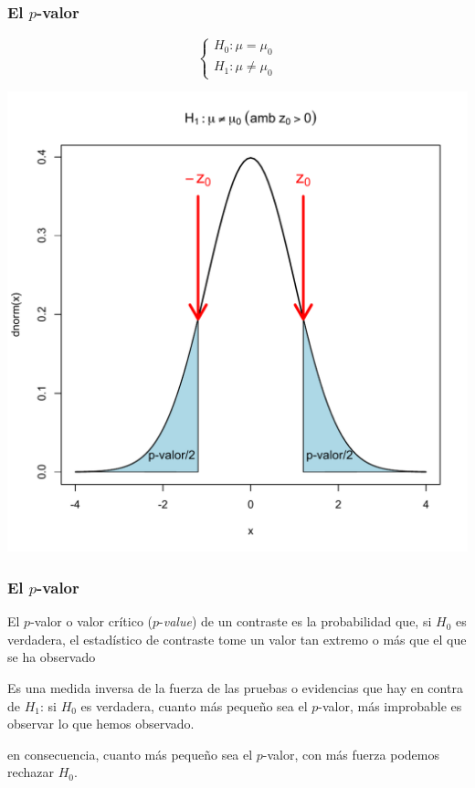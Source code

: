 \documentclass[12pt,t]{beamer}\usepackage[]{graphicx}\usepackage[]{color}
\renewcommand{\emph}[1]{{\color{red}#1}}
\theoremstyle{plain}
\theoremstyle{definition}
\begin{document}
\begin{frame}
\frametitle{El $p$-valor}
\vspace*{-0.75cm}

$$
\left\{\begin{array}{l}
H_{0}:\mu=\mu_{0}\\ H_{1}:\mu\neq\mu_{0}
\end{array}
\right.
$$
\begin{center}
\includegraphics[width=0.7\linewidth]{pvalor11.pdf}
\end{center}

\end{frame}


\begin{frame}
\frametitle{El $p$-valor}

El  \emph{$p$-valor} o  \emph{valor crítico}  ($p$-\textsl{value}) de un contraste es la probabilidad que, si $H_0$ es verdadera, el estadístico de contraste tome un valor tan extremo o  más que el que se ha observado
\bigskip


Es una  \emph{medida inversa de la fuerza de las pruebas o evidencias que hay en contra de $H_1$}: si $H_0$ es verdadera, cuanto más pequeño sea el $p$-valor, más improbable es observar lo  que hemos observado. 
\medskip

en consecuencia, cuanto  más pequeño sea el $p$-valor, con más fuerza podemos rechazar $H_0$.
\end{frame}
\end{document}

